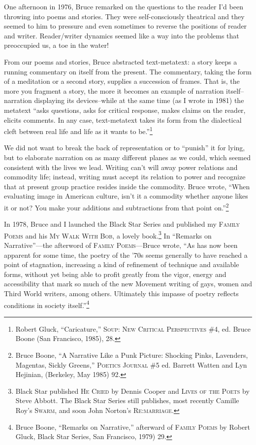 \documentclass[
]{memoir}
\begin{document}
One afternoon in 1976, Bruce remarked on the questions to the reader I'd
been throwing into poems and stories. They were self-consciously
theatrical and they seemed to him to pressure and even sometimes to
reverse the positions of reader and writer. Reader/writer dynamics
seemed like a way into the problems that preoccupied us, a toe in the
water!

From our poems and stories, Bruce abstracted text-metatext: a story
keeps a running commentary on itself from the present. The commentary,
taking the form of a meditation or a second story, supplies a succession
of frames. That is, the more you fragment a story, the more it becomes
an example of narration itself--narration displaying its devices--while
at the same time (as I wrote in 1981) the metatext ``asks questions,
asks for critical response, makes claims on the reader, elicits
comments. In any case, text-metatext takes its form from the dialectical
cleft between real life and life as it wants to be.''\footnote{Robert
  Gluck, ``Caricature,'' \textsc{Soup: New Critical Perspectives} \#4,
  ed. Bruce Boone (San Francisco, 1985), 28.}

We did not want to break the back of representation or to ``punish'' it
for lying, but to elaborate narration on as many different planes as we
could, which seemed consistent with the lives we lead. Writing can't
will away power relations and commodity life; instead, writing must
accept its relation to power and recognize that at present group
practice resides inside the commodity. Bruce wrote, ``When evaluating
image in American culture, isn't it a commodity whether anyone likes it
or not? You make your additions and subtractions from that point
on.''\footnote{Bruce Boone, ``A Narrative Like a Punk Picture: Shocking
  Pinks, Lavenders, Magentas, Sickly Greens,'' \textsc{Poetics Journal}
  \#5 ed. Barrett Watten and Lyn Hejinian, (Berkeley, May 1985) 92.}

In 1978, Bruce and I launched the Black Star Series and published my
\textsc{Family Poems} and his \textsc{My Walk With Bob}, a lovely
book.\footnote{Black Star published \textsc{He Cried} by Dennis Cooper
  and \textsc{Lives of the Poets} by Steve Abbott. The Black Star Series
  still publishes, most recently Camille Roy's \textsc{Swarm}, and soon
  John Norton's \textsc{Re:marriage}.} In ``Remarks on Narrative''---the
afterword of \textsc{Family Poems}---Bruce wrote, ``As has now been
apparent for some time, the poetry of the '70s seems generally to have
reached a point of stagnation, increasing a kind of refinement of
technique and available forms, without yet being able to profit greatly
from the vigor, energy and accessibility that mark so much of the new
Movement writing of gays, women and Third World writers, among others.
Ultimately this impasse of poetry reflects conditions in society
itself.''\footnote{Bruce Boone, ``Remarks on Narrative,'' afterward of
  \textsc{Family Poems} by Robert Gluck, Black Star Series, San
  Francisco, 1979) 29.}
\end{document}
